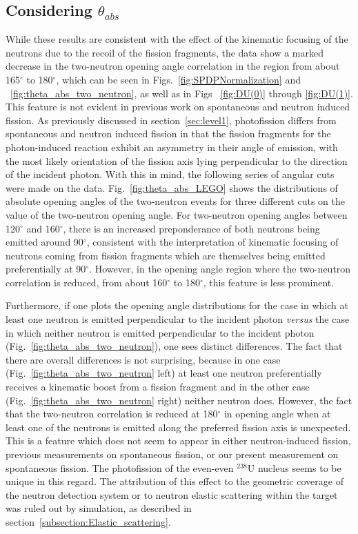 \subsection{Considering $\theta_{abs}$}
\label{sec:anomaly}
While these results are consistent with the effect of the kinematic focusing of the neutrons due to the recoil of the fission fragments, the data show a marked decrease in the two-neutron opening angle correlation in the region from about 165$^{\circ}$ to 180$^{\circ}$, which can be seen in Figs.~\ref{fig:SPDPNormalization} and ~\ref{fig:theta_abs_two_neutron}, as well as in Figs ~\ref{fig:DU(0)} through \ref{fig:DU(1)}.
This feature is not evident in previous work on spontaneous and neutron induced fission.
As previously discussed in section~\ref{sec:level1}, photofission differs from spontaneous and neutron induced fission in that the fission fragments for the photon-induced reaction exhibit an asymmetry in their angle of emission, with the most likely orientation of the fission axis lying perpendicular to the direction of the incident photon.
With this in mind, the following series of angular cuts were made on the data.
Fig.~\ref{fig:theta_abs_LEGO} shows the distributions of absolute opening angles of the two-neutron events for three different cuts on the value of the two-neutron opening angle.
For two-neutron opening angles between 120$^{\circ}$ and 160$^{\circ}$, there is an increased preponderance of both neutrons being emitted around 90$^{\circ}$, consistent with the interpretation of kinematic focusing of neutrons coming from fission fragments which are themselves being emitted preferentially at 90$^{\circ}$.
However, in the opening angle region where the two-neutron correlation is reduced, from about 160$^{\circ}$ to 180$^{\circ}$, this feature is less prominent.

Furthermore, if one plots the opening angle distributions for the case in which at least one neutron is emitted perpendicular to the incident photon \emph{versus} the case in which neither neutron is emitted perpendicular to the incident photon (Fig.~\ref{fig:theta_abs_two_neutron}), one sees distinct differences.
The fact that there are overall differences is not surprising, because in one case (Fig.~\ref{fig:theta_abs_two_neutron} left) at least one neutron preferentially receives a kinematic boost from a fission fragment and in the other case (Fig.~\ref{fig:theta_abs_two_neutron} right) neither neutron does.
However, the fact that the two-neutron correlation is reduced at 180$^{\circ}$ in opening angle when at least one of the neutrons is emitted along the preferred fission axis is unexpected.
This is a feature which does not seem to appear in either neutron-induced fission, previous measurements on spontaneous fission, or our present measurement on spontaneous fission.
The photofission of the even-even $^{238}$U nucleus seems to be unique in this regard. 
The attribution of this effect to the geometric coverage of the neutron detection system or to neutron elastic scattering within the target was ruled out by simulation, as described in section~\ref{subsection:Elastic_scattering}.

